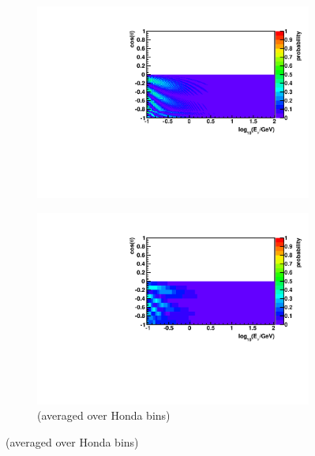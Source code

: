 \documentclass{beamer}
\begin{document}
\begin{frame}
\begin{figure}
		\begin{subfigure}[]{0.45\linewidth}
			\centering
			\vspace{-15pt}
			\caption*{ $\overline{\nu}_{e} \rightarrow \overline{\nu}_{\mu}$ }
			\vspace{-8pt}
			\includegraphics[width=\linewidth]{atm_nuebar2numubar.pdf} \\
			\vspace{-10pt}
			\caption*{(averaged over Honda bins)}
			\vspace{-8pt}
			\includegraphics[width=\linewidth]{atm_nuebar2numubar_avg.pdf}
		\end{subfigure}
	\end{figure}
\end{frame}
\end{document}
